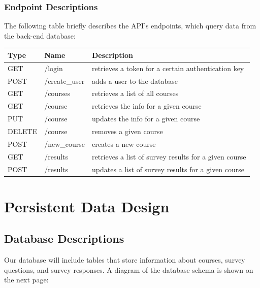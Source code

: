 \documentclass{article}
\begin{document}
\subsubsection{Endpoint Descriptions}

The following table briefly describes the API's endpoints, which query data from the back-end database:

\begin{center}
\begin{tabular}{|p{2cm}|p{2cm}|p{8cm}|} 
\hline
\textbf{Type} & \textbf{Name} & \textbf{Description} \\
\hline
GET & /login & retrieves a token for a certain authentication key\\ 
\hline
POST & /create\_user & adds a user to the database\\ 
\hline
GET & /courses & retrieves a list of all courses\\ 
\hline
GET & /course & retrieves the info for a given course\\ 
\hline
PUT & /course & updates the info for a given course\\ 
\hline
DELETE & /course & removes a given course\\ 
\hline
POST & /new\_course & creates a new course\\ 
\hline
GET & /results & retrieves a list of survey results for a given course\\ 
\hline
POST & /results & updates a list of survey results for a given course\\ 
\hline
\end{tabular}
\end{center}

\vspace{0mm}

\section{Persistent Data Design}
\subsection{Database Descriptions}

Our database will include tables that store information about courses, survey questions, and survey responses. A diagram of the database schema is shown on the next page:
\end{document}
